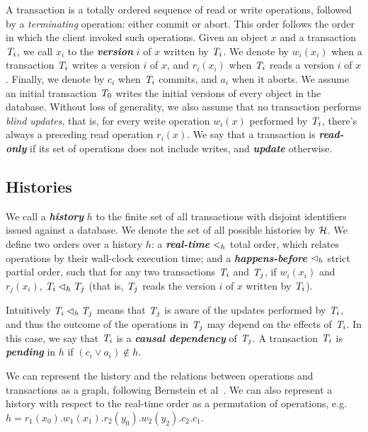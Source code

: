 A transaction is a totally ordered sequence of read or write operations, followed by a \emph{terminating} operation: either commit or abort. This order follows the order in which the client invoked such operations. Given an object $x$ and a transaction $\mathit{T}_i$, we call $x_i$ to the \textbf{\em version} $i$ of $x$ written by $\mathit{T}_i$. We denote by $w_i(x_i)$ when a transaction $\mathit{T}_i$ writes a version $i$ of $x$, and $r_i(x_i)$ when $\mathit{T}_i$ reads a version $i$ of $x$. Finally, we denote by $c_i$ when $\mathit{T}_i$ commits, and $a_i$ when it aborts. We assume an initial transaction $\mathit{T}_0$ writes the initial versions of every object in the database. Without loss of generality, we also assume that no transaction performs \emph{blind updates}, that is, for every write operation $w_i(x)$ performed by $\mathit{T}_i$, there's always a preceding read operation $r_i(x)$. We say that a transaction is \textbf{\em read-only} if its set of operations does not include writes, and \textbf{\em update} otherwise.

\subsection{Histories}
\label{sect:histories}

We call a \textbf{\em history} $h$ to the finite set of all transactions with disjoint identifiers issued against a database. We denote the set of all possible histories by $\mathcal{H}$. We define two orders over a history $h$: a \textbf{\em real-time} $<_h$ total order, which relates operations by their wall-clock execution time; and a \textbf{\em happens-before} $\lhd_h$ strict partial order, such that for any two transactions $\mathit{T}_i$ and $\mathit{T}_j$, if $w_i(x_i)$ and $r_j(x_i)$, $\mathit{T}_i \lhd_h \mathit{T}_j$ (that is, $\mathit{T}_j$ reads the version $i$ of $x$ written by $\mathit{T}_i$).

Intuitively $\mathit{T}_i \lhd_h \mathit{T}_j$ means that $\mathit{T}_j$ is aware of the updates performed by $\mathit{T}_i$, and thus the outcome of the operations in $\mathit{T}_j$ may depend on the effects of $\mathit{T}_i$. In this case, we say that $\mathit{T}_i$ is a \textbf{\em causal dependency} of $\mathit{T}_j$. A transaction $\mathit{T}_i$ is \textbf{\em pending} in $h$ if $(c_i \vee a_i) \notin h$.

We can represent the history and the relations between operations and transactions as a graph, following Bernstein et al~\citep{bernstein_concurrency}. We can also represent a history with respect to the real-time order as a permutation of operations, e.g. $h=r_1(x_0).w_1(x_1).r_2(y_0).w_2(y_2).c_2.c_1$.

